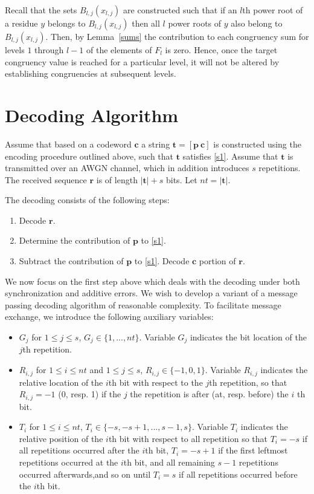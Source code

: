 Recall that the sets $B_{l,j}(x_{l,j})$ are constructed such that if
an $l$th power root of a residue $y$ belongs to $B_{l,j}(x_{l,j})$
then all $l$ power roots of $y$ also belong to $B_{l,j}(x_{l,j})$.
Then, by Lemma~\ref{sums} the contribution to each congruency sum
for levels $1$ through $l-1$ of the elements of $F_l$ is zero.
Hence, once the target congruency value is reached for a particular
level, it will not be altered by establishing congruencies at
subsequent levels.

\section{Decoding Algorithm}\label{dec}

Assume that based on a codeword $\mathbf{c}$ a string
$\mathbf{t}=[\mathbf{p} ~ \mathbf{c}]$ is constructed using the
encoding procedure outlined above, such that $\mathbf{t}$ satisfies
\eqref{s1}. Assume that $\mathbf{t}$ is transmitted over an AWGN
channel, which in addition introduces $s$ repetitions. The received
sequence $\mathbf{r}$ is of length $|\mathbf{t}|+s$ bits. Let
$nt=|\mathbf{t}|$.

The decoding consists of the following steps:
\begin{enumerate}
\item Decode $\mathbf{r}$. \item Determine the contribution of
$\mathbf{p}$ to \eqref{s1}. \item Subtract the contribution of
$\mathbf{p}$ to \eqref{s1}. Decode $\mathbf{c}$ portion of
$\mathbf{r}$.
\end{enumerate}

We now focus on the first step above which deals with the decoding
under both synchronization and additive errors. We wish to develop a
variant of a message passing decoding algorithm of reasonable
complexity. To facilitate message exchange, we introduce the
following auxiliary variables:
\begin{itemize}
\item $G_j$ for $1 \leq j \leq s$, $G_j \in \{1,...,nt\}$.
Variable $G_j$ indicates the bit location of the $j$th repetition.
 \item $R_{i,j}$ for $1\leq i \leq nt$ and $1 \leq j \leq s$, $R_{i,j} \in \{-1,0,1\}$. Variable $R_{i,j}$ indicates the relative
 location of the $i$th bit with respect to the $j$th repetition, so that $R_{i,j}=-1$ (0, resp. 1) if the
 $j$ the repetition is after (at, resp. before) the $i$ th bit.\item
 $T_i$ for  $1\leq i \leq nt$, $T_i \in \{-s,-s+1,...,s-1,s\}$.
 Variable $T_i$ indicates the relative position of the $i$th bit with respect to all
 repetition so that $T_i=-s$ if all repetitions occurred after the
 $i$th bit,  $T_i=-s+1$ if the first leftmost repetitions occurred at the
 $i$th bit, and all remaining $s-1$ repetitions occurred
 afterwards,and so on until $T_i=s$ if all repetitions occurred before the
 $i$th bit.
\end{itemize}

